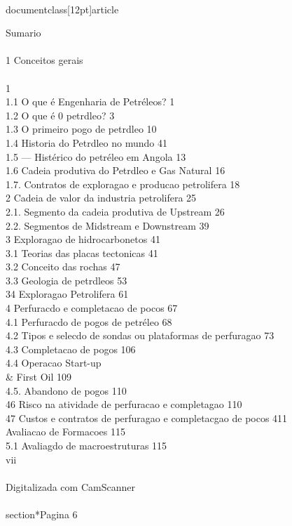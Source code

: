 \\documentclass[12pt]{article}
\begin{document}
Sumario\\
\\
1 Conceitos gerais\\
\\
1\\
1.1 O que é Engenharia de Petréleos? 1\\
1.2 O que é 0 petrdleo? 3\\
1.3 O primeiro pogo de petrdleo 10\\
1.4 Historia do Petrdleo no mundo 41\\
1.5 — Histérico do petréleo em Angola 13\\
1.6  Cadeia produtiva do Petrdleo e Gas Natural 16\\
1.7. Contratos de exploragao e producao petrolifera 18\\
2  Cadeia de valor da industria petrolifera 25\\
2.1. Segmento da cadeia produtiva de Upstream 26\\
2.2. Segmentos de Midstream e Downstream 39\\
3  Exploragao de hidrocarbonetos 41\\
3.1 Teorias das placas tectonicas 41\\
3.2 Conceito das rochas 47\\
3.3 Geologia de petrdleos 53\\
34  Exploragao Petrolifera 61\\
4 Perfuracdo e completacao de pocos 67\\
4.1 Perfuracdo de pogos de petréleo 68\\
4.2  Tipos e selecdo de sondas ou plataformas de perfuragao 73\\
4.3 Completacao de pogos 106\\
4.4 Operacao Start-up \\& First Oil 109\\
4.5. Abandono de pogos 110\\
46 Risco na atividade de perfuracao e completagao 110\\
47 Custos e contratos de perfuragao e completacgao de pocos 411\\
Avaliacao de Formacoes 115\\
5.1 Avaliagdo de macroestruturas 115\\
vii\\
\\
Digitalizada com CamScanner\\

\\section*{Pagina 6}
\end{document}
